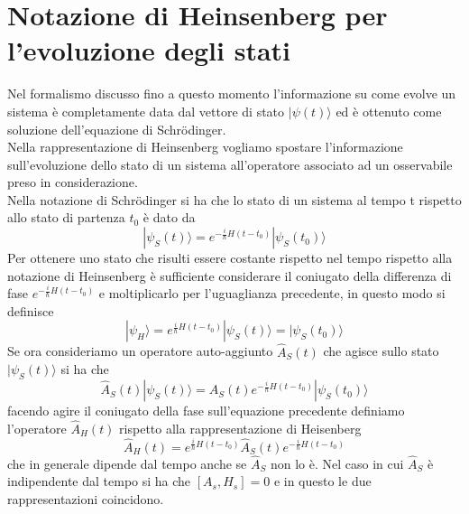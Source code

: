 \section{Notazione di Heinsenberg per l'evoluzione degli stati}

Nel formalismo discusso fino a questo momento l'informazione su come evolve un sistema \`e completamente data dal vettore di stato $|\psi(t) \rangle $ ed \`e ottenuto come soluzione dell'equazione di Schr\"odinger.
\\

\noindent Nella rappresentazione di Heinsenberg vogliamo spostare l'informazione sull'evoluzione dello stato di un sistema all'operatore associato ad un osservabile preso in considerazione. 
\\
Nella notazione di Schr\"odinger  si ha che lo stato di un sistema al tempo t rispetto allo stato di partenza $t_0$ \`e dato da 
\begin{equation*}
	|\psi_S(t) \rangle  = e^{-\frac{i}{\hbar}H(t-t_0)}|\psi_S(t_0)\rangle 
\end{equation*}
Per ottenere uno stato che risulti essere costante rispetto nel tempo rispetto alla notazione di Heinsenberg \`e sufficiente considerare il coniugato della differenza di fase $e^{-\frac{i}{\hbar}H(t-t_0)}$ e moltiplicarlo per l'uguaglianza precedente, in questo modo si definisce 
\begin{equation*}
	|\psi_H \rangle =  e^{\frac{i}{\hbar}H(t-t_0)}|\psi_S(t) \rangle = |\psi_S(t_0) \rangle 
\end{equation*}
Se ora consideriamo un operatore auto-aggiunto $\hat{A}_S(t)$ che agisce sullo stato $|\psi_S(t) \rangle $  si ha che 
\begin{equation*}
	\hat{A}_S(t)|\psi_S(t) \rangle  = \hat{A}_S(t)e^{-\frac{i}{\hbar}H(t-t_0)}|\psi_{S}(t_0) \rangle 
\end{equation*}
facendo agire il coniugato della fase sull'equazione precedente definiamo l'operatore $\hat{A}_H(t)$ rispetto alla rappresentazione di Heisenberg
\begin{equation*}
	\hat{A}_H(t) = e^{\frac{i}{\hbar}H(t-t_0)}\hat{A}_S(t)e^{-\frac{i}{\hbar}H(t-t_0)}
\end{equation*}
che in generale dipende dal tempo anche se $\hat{A}_S$ non lo \`e. Nel caso in cui $\hat{A}_S$ \`e indipendente dal tempo si ha che $[A_s,H_s] = 0$ e in questo le due rappresentazioni coincidono.
\\

